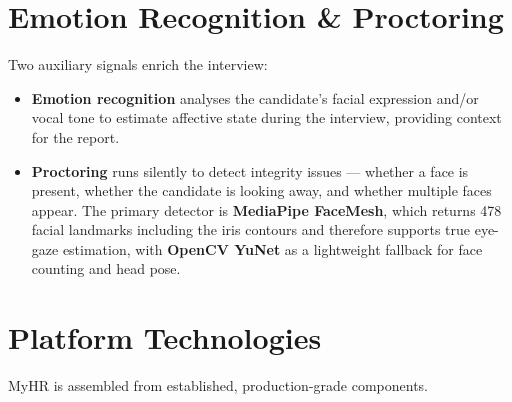 \documentclass[12pt,a4paper,oneside]{report}
\begin{document}
\section{Emotion Recognition \& Proctoring}

Two auxiliary signals enrich the interview:

\begin{itemize}
  \item \textbf{Emotion recognition} analyses the candidate's facial expression and/or vocal
    tone to estimate affective state during the interview, providing context for the report.
  \item \textbf{Proctoring} runs silently to detect integrity issues --- whether a face is
    present, whether the candidate is looking away, and whether multiple faces appear. The
    primary detector is \textbf{MediaPipe FaceMesh}, which returns 478 facial landmarks
    including the iris contours and therefore supports true eye-gaze estimation, with
    \textbf{OpenCV YuNet} as a lightweight fallback for face counting and head pose.
\end{itemize}

\section{Platform Technologies}

MyHR is assembled from established, production-grade components.
\end{document}
